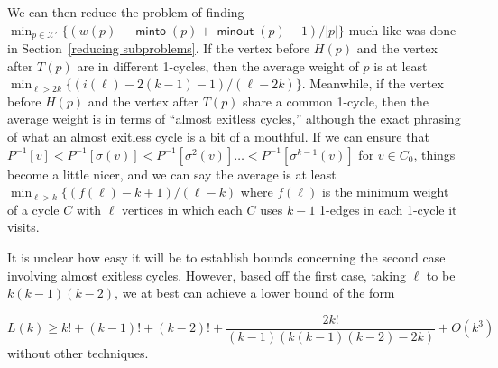 \documentclass{article}
\DeclareMathOperator{\minto}{\bm{\mathsf{minto}}}
\DeclareMathOperator{\minout}{\bm{\mathsf{minout}}}
\newcommand{\edit}[1]{}%
\newcommand{\hides}[1]{}%
\begin{document}
We can then reduce the problem of finding $\min_{p \in \mathcal{X}'}\{(w(p)+\minto(p)+\minout(p)-1)/|p|\}$ much like was done in Section~\ref{reducing subproblems}. If the vertex before $H(p)$ and the vertex after $T(p)$ are in different 1-cycles, then the average weight of $p$ is at least $\min_{\ell > 2k} \{(i(\ell)-2(k-1)-1)/(\ell-2k)\} $. Meanwhile, if the vertex before $H(p)$ and the vertex after $T(p)$ share a common 1-cycle, then the average weight is in terms of ``almost exitless cycles,'' although the exact phrasing of what an almost exitless cycle is a bit of a mouthful. If we can ensure that $P^{-1}[v]  <P^{-1}[\sigma(v)] < P^{-1}[\sigma^2(v)] \dots < P^{-1}[\sigma^{k-1}(v)]$ for $v \in C_0$, things become a little nicer, and we can say the average is at least $\min_{\ell > k} \{(f(\ell)-k+1)/(\ell-k)$ where $f(\ell)$ is the minimum weight of a cycle $C$ with $\ell$ vertices in which each $C$ uses $k-1$ 1-edges in each 1-cycle it visits. 

It is unclear how easy it will be to establish bounds concerning the second case involving almost exitless cycles. However, based off the first case, taking $\ell$ to be $k(k-1)(k-2)$, we at best can achieve a lower bound of the form

\[ L(k) \geq k!+(k-1)!+(k-2)! + \frac{2k!}{(k-1)(k(k-1)(k-2)-2k)} + O(k^3)\]
without other techniques.

\hides{\subsection{Further applications} \label{further}

We believe it is would also be interesting to solve 

\begin{itemize}
    \item Random model of $\mathcal{S}_k$. I believe it would be manageable to get decent bounds on models where the weights of edges in 1-cycles have change according to some probablity space.
    \item Fixed modifications of $\mathcal{S}_k$, where we remove some edges. For example, if we consider the case in which we only have the edges $\sigma$ and $\tau$, we immediately get that Greg Egan's upper bound is tight within an error of $1+1/(k-2)$. (In other literature it has shown to be absolutely tight in this case.)\edit{ maybe cite this result}
    \item Other subgraphs of the De Brujin graph
    \item Weighted pancake graph
\end{itemize}}
\end{document}
